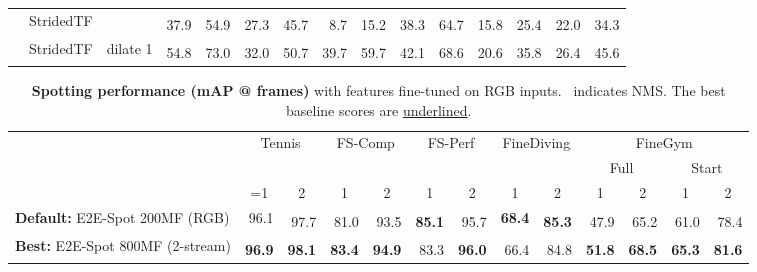 \documentclass[runningheads]{llncs}
\newcommand{\OURMETHOD}{{E2E-Spot}\xspace}
\newcommand{\fscomp}{{FS-Comp}\xspace}
\newcommand{\fsperf}{{FS-Perf}\xspace}
\newcommand{\tennis}{{Tennis}\xspace}
\newcommand{\finegym}{{FineGym}\xspace}
\newcommand{\finediving}{{FineDiving}\xspace}
\newcommand{\best}[1]{\underline{#1}}
\newcommand{\sota}[1]{\textbf{#1}}
\newcommand{\nms}{\textsuperscript{\textdagger}}
\begin{document}
\begin{table*}[p]
{\begin{tabularx}{\textwidth}{lll
        rr
        rr
        rr
        rr
        rr
        rr
    }
        \cmidrule{2-15}
        & StridedTF &
            & \nms 37.9 & \nms 54.9 & \nms 27.3 & \nms 45.7 & \nms 8.7 & \nms 15.2 & \nms 38.3 & \nms 64.7 & \nms 15.8 & \nms 25.4 & \nms 22.0 & \nms 34.3 \\

        & StridedTF & dilate 1
            & \nms 54.8 & \nms 73.0 & \nms 32.0 & \nms 50.7 & \nms 39.7 & \nms 59.7 & \nms 42.1 & \nms 68.6 & \nms 20.6 & \nms 35.8 & \nms 26.4 & \nms 45.6 \\

        \bottomrule
    \end{tabularx}
    }
\end{table*}


\begin{table*}[p]
    \centering
    \caption{{\bf Spotting performance (mAP @  frames)} with features fine-tuned on RGB inputs.
    \textdagger~indicates NMS. The best baseline scores are \best{underlined}.
    }
    \label{tab:supp_full_fine_tuned}
    \vspace{0.5em}
    {
    \tiny
    \begin{tabularx}{\textwidth}{lll
        rr
        rr
        rr
        rr
        rr
        rr
    }
        \toprule
        &&
            & \multicolumn{2}{c}{\tennis}
            & \multicolumn{2}{c}{\fscomp}
            & \multicolumn{2}{c}{\fsperf}
            & \multicolumn{2}{c}{\finediving}
            & \multicolumn{4}{c}{\finegym}
            \\
        &&
            & \multicolumn{2}{c}{}
            & \multicolumn{2}{c}{}
            & \multicolumn{2}{c}{}
            & \multicolumn{2}{c}{}
            & \multicolumn{2}{c}{Full}
            & \multicolumn{2}{c}{Start}
            \\
        &&
            & \multicolumn{1}{c}{=1}
            & \multicolumn{1}{c}{2}
            & \multicolumn{1}{c}{1}
            & \multicolumn{1}{c}{2}
            & \multicolumn{1}{c}{1}
            & \multicolumn{1}{c}{2}
            & \multicolumn{1}{c}{1}
            & \multicolumn{1}{c}{2}
            & \multicolumn{1}{c}{1}
            & \multicolumn{1}{c}{2}
            & \multicolumn{1}{c}{1}
            & \multicolumn{1}{c}{2}
            \\
        \midrule

        \multicolumn{3}{l}{{\bf Default:} \OURMETHOD 200MF (RGB)}
            & 96.1 & \nms 97.7
            & \nms 81.0 & \nms 93.5 & \nms \sota{85.1} & \nms 95.7 & \sota{68.4} & \nms \sota{85.3}
            & \nms 47.9 & \nms 65.2
            & \nms 61.0 & \nms 78.4
            \\
        \multicolumn{3}{l}{{\bf Best:} \OURMETHOD 800MF (2-stream)}
            & \nms \sota{96.9} & \nms \sota{98.1}
            & \nms \sota{83.4} & \nms \sota{94.9} & \nms 83.3 & \nms \sota{96.0} & \nms 66.4 & \nms 84.8
            & \nms \sota{51.8} & \nms \sota{68.5}
            & \nms \sota{65.3} & \nms \sota{81.6}
            \\


\end{tabularx}}
\end{table*}
\end{document}
